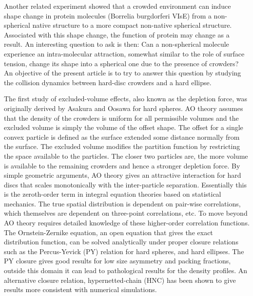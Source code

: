 
Another related experiment showed that a crowded environment can induce shape change in protein molecules (Borrelia burgdorferi VIsE) from a non-spherical native structure to a more compact non-native spherical structure.\cite{homouz_crowded_2008} Associated with this shape change, the function of protein may change as a result. An interesting question to ask is then: Can a non-spherical molecule experience an intra-molecular attraction, somewhat similar to the role of  surface tension, change its shape into a spherical one due to the presence of crowders?  An objective of the present article is to try to answer this question by studying the collision dynamics between hard-disc crowders and a hard ellipse. 

The first study of excluded-volume effects, also known as the depletion force, was originally derived by Asakura and Oosawa\cite{asakura_interaction_1958} for hard spheres. AO theory assumes that the density of the crowders is uniform for all permissible volumes and the excluded volume is simply the volume of the offset shape. The offset for a single convex particle is defined as the surface extended some distance normally from the surface. The excluded volume modifies the partition function by restricting the space available to the particles. The closer two particles are, the more volume is available to the remaining crowders and hence a stronger depletion force. By simple geometric arguments, AO theory gives an attractive interaction for hard discs that scales monotonically with the inter-particle separation. Essentially this is the zeroth-order term in integral equation theories based on statistical mechanics. The true spatial distribution is dependent on pair-wise correlations, which themselves are dependent on three-point correlations, etc. To move beyond AO theory requires detailed knowledge of these higher-order correlation functions. The Ornstein-Zernike equation, an open equation that gives the exact distribution function, can be solved analytically under proper closure relations such as the Percus-Yevick (PY) relation for hard spheres,\cite{wertheim_exact_1963} and hard ellipses.\cite{ward_structure_1988} The PY closure gives good results for low size asymmetry and packing fractions, outside this domain it can lead to pathological results for the density profiles. An alternative closure relation, hypernetted-chain (HNC) \cite{van_leeuwen_new_1959} has been shown to give results more consistent with numerical simulations.\cite{kinoshita_interaction_1996}

